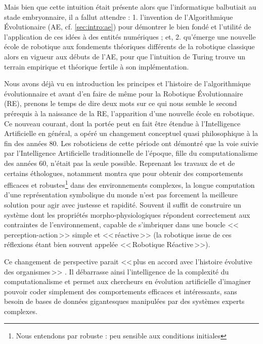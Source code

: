 Mais bien que cette intuition était présente alors que l'informatique balbutiait au stade embryonnaire, il a fallut attendre : 1. l'invention de l'Algorithmique \'Evolutionaire (AE, cf. \ref{sec:intro:ae}) pour démontrer le bien fondé et l'utilité de l'application de ces idées à des entités numériques ; et, 2. qu'émerge une nouvelle école de robotique aux fondements théoriques différents de la robotique classique alors en vigueur aux débuts de l'AE, pour que l'intuition de Turing trouve un terrain empirique et théorique fertile à son implémentation.

Nous avons déjà vu en introduction les principes et l'histoire de l'algorithmique évolutionnaire et avant d'en faire de même pour la Robotique \'Evolutionnaire (RE), prenons le temps de dire deux mots sur ce qui nous semble le second prérequis à la naissance de la RE, l'apparition d'une nouvelle école en robotique. 
Ce nouveau courant, dont la portée peut en fait être étendue à l'Intelligence Artificielle en général, a opéré un changement conceptuel quasi philosophique à la fin des années 80. Les roboticiens de cette période ont démontré que la voie suivie par l'Intelligence Artificielle traditionnelle de l'époque, fille du computationalisme des années 60, n'était pas la seule possible. Reprenant les travaux de \citet{braintenberg86vehicles} et de certains éthologues, \cite{brooks91intelligencewithoutreason} notamment montra que pour obtenir des comportements efficaces et robustes\footnote{Nous entendons par robuste : peu sensible aux conditions initiales} dans des environnements complexes, la longue computation d'une représentation symbolique du monde n'est pas forcement la meilleure solution pour agir avec justesse et rapidité. Souvent il suffit de construire un système dont les propriétés morpho-physiologiques répondent correctement aux contraintes de l'environnement, capable de s'imbriquer dans une boucle <<\,perception-action\,>> simple et <<\,réactive\,>> (la robotique issue de ces réflexions étant bien souvent appelée <<\,Robotique Réactive\,>>).

Ce changement de perspective parait <<\,plus en accord avec l'histoire évolutive des organismes\,>> \citep[Brooks dans la préface de ][p. 15]{pfeifer2006howthebodyshapesthewaywethink}. Il débarrasse ainsi l'intelligence de la complexité du computationalisme et permet aux chercheurs en évolution artificielle d'imaginer pouvoir coder simplement des comportements efficaces et intéressants, sans besoin de bases de données gigantesques manipulées par des systèmes experts complexes. 

